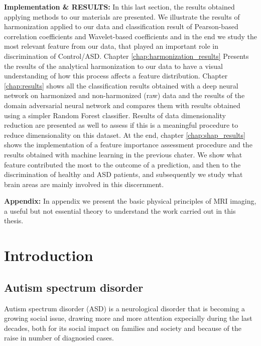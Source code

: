 \documentclass[10pt]{report}
\begin{document}
\textbf{Implementation \& RESULTS:} In this last section, the results obtained applying methods to our materials are presented. We illustrate the results of harmonization applied to our data and classification result of Pearson-based correlation coefficients and Wavelet-based coefficients and in the end we study the most relevant feature from our data, that played an important role in discrimination of Control/ASD.
Chapter \ref{chap:harmonization_results} Presents the results of the analytical harmonization to our data to have a visual understanding of how this process affects a feature distribution.
Chapter \ref{chap:results} shows all the classification results obtained with a deep neural network on harmonized and non-harmonized (raw) data and the results of the domain adversarial neural network and compares them with results obtained using a simpler Random Forest classifier. Results of data dimensionality reduction are presented as well to assess if this is a meaningful procedure to reduce dimensionality on this dataset.
At the end, chapter \ref{chap:shap_results} shows the implementation of a feature importance assessment procedure and the results obtained with machine learning in the previous chater. We show what feature contributed the most to the outcome of a prediction, and then to the discrimination of healthy and ASD patients, and subsequently we study what brain areas are mainly involved in this discernment.


\textbf{Appendix:} In appendix we present the basic physical principles of MRI imaging, a useful but not essential theory to understand the work carried out in this thesis.



\chapter{Introduction}
\section{Autism spectrum disorder} \label{chap:autism}
Autism spectrum disorder (ASD) is a neurological disorder that is becoming a growing social issue, drawing more and more attention expecially during the last decades, both for its social impact on families and society and because of the raise in number of diagnosied cases.
\end{document}
